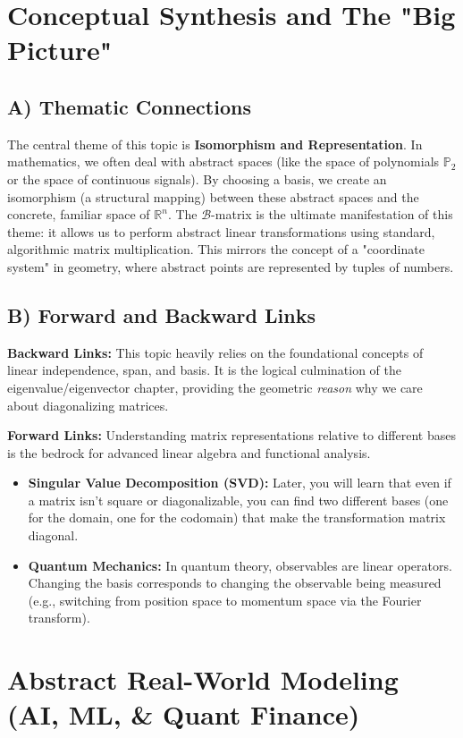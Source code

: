 \documentclass[11pt, a4paper]{article}
\theoremstyle{definition}
\theoremstyle{remark}
\newcommand{\R}{\mathbb{R}}
\begin{document}
\section{Conceptual Synthesis and The "Big Picture"}

\subsection{A) Thematic Connections}
The central theme of this topic is \textbf{Isomorphism and Representation}. In mathematics, we often deal with abstract spaces (like the space of polynomials $\mathbb{P}_2$ or the space of continuous signals). By choosing a basis, we create an isomorphism (a structural mapping) between these abstract spaces and the concrete, familiar space of $\R^n$. The $\mathcal{B}$-matrix is the ultimate manifestation of this theme: it allows us to perform abstract linear transformations using standard, algorithmic matrix multiplication. This mirrors the concept of a "coordinate system" in geometry, where abstract points are represented by tuples of numbers.

\subsection{B) Forward and Backward Links}
\textbf{Backward Links:} This topic heavily relies on the foundational concepts of linear independence, span, and basis. It is the logical culmination of the eigenvalue/eigenvector chapter, providing the geometric \textit{reason} why we care about diagonalizing matrices.

\textbf{Forward Links:} Understanding matrix representations relative to different bases is the bedrock for advanced linear algebra and functional analysis. 
\begin{itemize}
    \item \textbf{Singular Value Decomposition (SVD):} Later, you will learn that even if a matrix isn't square or diagonalizable, you can find two different bases (one for the domain, one for the codomain) that make the transformation matrix diagonal.
    \item \textbf{Quantum Mechanics:} In quantum theory, observables are linear operators. Changing the basis corresponds to changing the observable being measured (e.g., switching from position space to momentum space via the Fourier transform).
\end{itemize}

\newpage
\section{Abstract Real-World Modeling (AI, ML, \& Quant Finance)}
\end{document}
